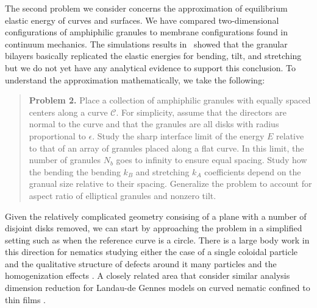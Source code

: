 The second problem we consider concerns the approximation
of equilibrium elastic energy of curves and surfaces.
We have compared two-dimensional configurations of amphiphilic granules
to membrane configurations found in continuum mechanics.
The simulations results in~\cite{Fu2018_SIAM,FuQuRyYo22}
showed that the granular bilayers 
basically replicated the elastic energies for bending, tilt, and
stretching
but we do not yet have any analytical evidence to support this conclusion.
To understand the approximation mathematically, we take the following:
\begin{quotation}
  \textbf{Problem 2.} Place a collection of
  amphiphilic granules
with equally spaced centers along a curve $\mathcal{C}$.
For simplicity, assume that the directors are normal to the curve
and that the granules are all disks with radius proportional to $\epsilon$. 
Study the sharp interface limit of the energy $E$ 
relative to that of an array of granules placed along a flat curve. 
In this limit, the number of granules $N_b$ goes to infinity
to ensure equal spacing.
Study how the bending the bending $k_B$ and stretching $k_A$ coefficients
depend on the granual size relative to their spacing.
Generalize the problem to account for aspect ratio of elliptical granules
and nonzero tilt. 
\end{quotation}
Given the relatively complicated geometry consising
of a plane with a number of disjoint disks removed, 
we can start by approaching the problem in a simplified
setting such as when the reference curve is a circle.
There is a large body work in this direction for nematics
studying either the case of a single coloidal particle and
the qualitative structure of defects around it
\cite{Alama2015MinimizersOT, Alama2021SaturnRD, PhysRevE.96.042702}
many particles and the homogenization effects
\cite{Canevari2019DesignOE,doi:10.1137/18M1163919,doi:10.1137/18M1163919,BERLYAND200597,doi:10.1137/130910348}.
A closely related area that consider similar analysis
dimension reduction for
Landau-de Gennes models on curved nematic confined to thin films
\cite{Golovaty2017DimensionRF, Golovaty2015DimensionRF,doi:10.1142/S0218202516500470, FoFrLe07}.




%
%
%
%
%
%
